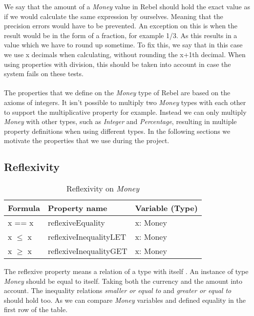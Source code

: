 We say that the amount of a \textit{Money} value in Rebel should hold the exact value as if we would calculate the same expression by ourselves. Meaning that the precision errors would have to be prevented. An exception on this is when the result would be in the form of a fraction, for example 1/3. As this results in a value which we have to round up sometime. To fix this, we say that in this case we use x decimals when calculating, without rounding the x+1th decimal. When using properties with division, this should be taken into account in case the system fails on these tests. \\
\\
The properties that we define on the \textit{Money} type of Rebel are based on the axioms of integers. It isn't possible to multiply two \textit{Money} types with each other to support the multiplicative property for example. Instead we can only multiply \textit{Money} with other types, such as \textit{Integer} and \textit{Percentage}, resulting in multiple property definitions when using different types. In the following sections we motivate the properties that we use during the project.
\subsection{Reflexivity}
\begin{table}[h!]
\centering
\begin{tabular}{|lll|}
\hline
                        \textbf{Formula} & \textbf{Property name} & \textbf{Variable (Type)} \\ \hline
\rowcolor[HTML]{EFEFEF} x == x           & reflexiveEquality      & x: Money                 \\
                        x $\leq$ x       & reflexiveInequalityLET & x: Money                 \\
\rowcolor[HTML]{EFEFEF} x $\geq$ x       & reflexiveInequalityGET & x: Money                 \\ \hline
\end{tabular}
\caption{Reflexivity on \textit{Money}}
\label{tbl:ch4_money_reflexivity}
\end{table}
The reflexive property means a relation of a type with itself \cite{raftery2011perspective}. An instance of type \textit{Money} should be equal to itself. Taking both the currency and the amount into account. The inequality relations \textit{smaller or equal to} and \textit{greater or equal to} should hold too. As we can compare \textit{Money} variables and defined equality in the first row of the table.

